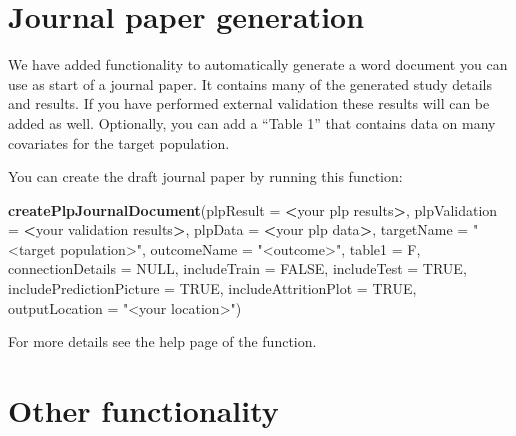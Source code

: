 \documentclass[]{book}
\newenvironment{Shaded}{\begin{snugshade}}{\end{snugshade}}
\newcommand{\KeywordTok}[1]{\textcolor[rgb]{0.13,0.29,0.53}{\textbf{#1}}}
\newcommand{\DataTypeTok}[1]{\textcolor[rgb]{0.13,0.29,0.53}{#1}}
\newcommand{\StringTok}[1]{\textcolor[rgb]{0.31,0.60,0.02}{#1}}
\newcommand{\OtherTok}[1]{\textcolor[rgb]{0.56,0.35,0.01}{#1}}
\newcommand{\OperatorTok}[1]{\textcolor[rgb]{0.81,0.36,0.00}{\textbf{#1}}}
\newcommand{\NormalTok}[1]{#1}
\begin{document}
\section{Journal paper generation}\label{journal-paper-generation}

We have added functionality to automatically generate a word document
you can use as start of a journal paper. It contains many of the
generated study details and results. If you have performed external
validation these results will can be added as well. Optionally, you can
add a ``Table 1'' that contains data on many covariates for the target
population.

You can create the draft journal paper by running this function:

\begin{Shaded}
\begin{Highlighting}[]
 \KeywordTok{createPlpJournalDocument}\NormalTok{(}\DataTypeTok{plpResult =} \OperatorTok{<}\NormalTok{your plp results}\OperatorTok{>}\NormalTok{,}
                          \DataTypeTok{plpValidation =} \OperatorTok{<}\NormalTok{your validation results}\OperatorTok{>}\NormalTok{,}
                          \DataTypeTok{plpData =} \OperatorTok{<}\NormalTok{your plp data}\OperatorTok{>}\NormalTok{,}
                          \DataTypeTok{targetName =} \StringTok{"<target population>"}\NormalTok{,}
                          \DataTypeTok{outcomeName =} \StringTok{"<outcome>"}\NormalTok{,}
                          \DataTypeTok{table1 =}\NormalTok{ F,}
                          \DataTypeTok{connectionDetails =} \OtherTok{NULL}\NormalTok{,}
                          \DataTypeTok{includeTrain =} \OtherTok{FALSE}\NormalTok{,}
                          \DataTypeTok{includeTest =} \OtherTok{TRUE}\NormalTok{,}
                          \DataTypeTok{includePredictionPicture =} \OtherTok{TRUE}\NormalTok{,}
                          \DataTypeTok{includeAttritionPlot =} \OtherTok{TRUE}\NormalTok{,}
                          \DataTypeTok{outputLocation =} \StringTok{"<your location>"}\NormalTok{)}
\end{Highlighting}
\end{Shaded}

For more details see the help page of the function.

\newpage

\section{Other functionality}\label{other-functionality}
\end{document}
